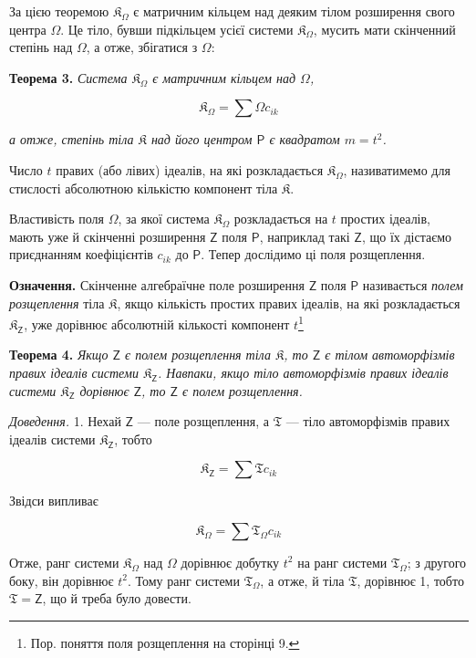 \documentclass[11pt]{article}
\newcommand{\srcfn}[2]{\footnote{#2}}
\begin{document}
За цією теоремою \(\mathfrak K_\Omega\) є матричним кільцем над деяким тілом розширення свого центра \(\Omega\). Це тіло, бувши підкільцем усієї системи \(\mathfrak K_\Omega\), мусить мати скінченний степінь над \(\Omega\), а отже, збігатися з \(\Omega\):

\textbf{Теорема 3.} \emph{Система \(\mathfrak K_\Omega\) є матричним кільцем над \(\Omega\),}

\[
\mathfrak K_\Omega=\sum\Omega c_{ik}
\]

\emph{а отже, степінь тіла \(\mathfrak K\) над його центром \(\mathsf P\) є квадратом \(m=t^2\).}

Число \(t\) правих (або лівих) ідеалів, на які розкладається \(\mathfrak K_\Omega\), називатимемо для стислості абсолютною кількістю компонент тіла \(\mathfrak K\).

Властивість поля \(\Omega\), за якої система \(\mathfrak K_\Omega\) розкладається на \(t\) простих ідеалів, мають уже й скінченні розширення \(\mathsf{Z}\) поля \(\mathsf P\), наприклад такі \(\mathsf{Z}\), що їх дістаємо приєднанням коефіцієнтів \(c_{ik}\) до \(\mathsf P\). Тепер дослідимо ці поля розщеплення.

\textbf{Означення.} Скінченне алгебраїчне поле розширення \(\mathsf{Z}\) поля \(\mathsf P\) називається \emph{полем розщеплення} тіла \(\mathfrak K\), якщо кількість простих правих ідеалів, на які розкладається \(\mathfrak K_{\mathsf{Z}}\), уже дорівнює абсолютній кількості компонент \(t\)\srcfn{1}{Пор. поняття поля розщеплення на сторінці 9.}

\textbf{Теорема 4.} \emph{Якщо \(\mathsf{Z}\) є полем розщеплення тіла \(\mathfrak K\), то \(\mathsf{Z}\) є тілом автоморфізмів правих ідеалів системи \(\mathfrak K_{\mathsf{Z}}\). Навпаки, якщо тіло автоморфізмів правих ідеалів системи \(\mathfrak K_{\mathsf{Z}}\) дорівнює \(\mathsf{Z}\), то \(\mathsf{Z}\) є полем розщеплення.}

\emph{Доведення.} 1. Нехай \(\mathsf{Z}\) --- поле розщеплення, а \(\mathfrak T\) --- тіло автоморфізмів правих ідеалів системи \(\mathfrak K_{\mathsf{Z}}\), тобто

\[
\mathfrak K_{\mathsf{Z}}=\sum\mathfrak T c_{ik}
\]

Звідси випливає

\[
\mathfrak K_\Omega=\sum\mathfrak T_\Omega c_{ik}
\]

Отже, ранг системи \(\mathfrak K_\Omega\) над \(\Omega\) дорівнює добутку \(t^2\) на ранг системи \(\mathfrak T_\Omega\); з другого боку, він дорівнює \(t^2\). Тому ранг системи \(\mathfrak T_\Omega\), а отже, й тіла \(\mathfrak T\), дорівнює 1, тобто \(\mathfrak T=\mathsf{Z}\), що й треба було довести.
\end{document}
